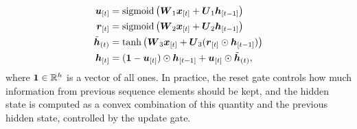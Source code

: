 \begin{align*}
    \Elem{u}{t} &= \sigmoid\Par{\Matrix{W}_{1}\Elem{x}{t} + \Matrix{U}_{1}\Elem{h}{t-1}}\\
    \Elem{r}{t} &= \sigmoid\Par{\Matrix{W}_{2}\Elem{x}{t} + \Matrix{U}_{2}\Elem{h}{t-1}}\\
    \tilde{\Vector{h}}_{(t)} &= \tanh\Par{\Matrix{W}_{3}\Elem{x}{t} + \Matrix{U}_{3}(\Elem{r}{t} \odot \Elem{h}{t-1})}\\
    \Elem{h}{t} &= (\Ones - \Elem{u}{t}) \odot \Elem{h}{t-1} + \Elem{u}{t} \odot \tilde{\Vector{h}}_{(t)},
\end{align*}
where $\boldsymbol{1} \in \mathbb{R}^h$ is a vector of all ones. In practice, the reset gate controls how much information from previous sequence elements should be kept, and the hidden state is computed as a convex combination of this quantity and the previous hidden state, controlled by the update gate.

